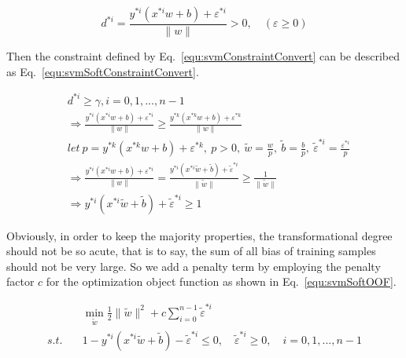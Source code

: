\documentclass[runningheads,openany]{xhlPaper}
\begin{document}
\begin{equation}
\label{equ:svmSoftDistance}
{d^{*i}} = \frac{{{y^{*i}}\left( {{x^{*i}}w + b} \right) + {\varepsilon ^{*i}}}}{{\parallel w\parallel }} > 0,\quad \left(\varepsilon \ge 0\right)
\end{equation}

Then the constraint defined by Eq.~\ref{equ:svmConstraintConvert} can be described as Eq.~\ref{equ:svmSoftConstraintConvert}.

\begin{equation}
\label{equ:svmSoftConstraintConvert}
\begin{aligned}
&{d^{*i}} \ge \gamma ,i = 0,1,...,n - 1\\
 &\Rightarrow \frac{{{y^{*i}}\left( {{x^{*i}}w + b} \right) + {\varepsilon ^{*i}}}}{{\parallel w\parallel }} \ge \frac{{{y^{*k}}\left( {{x^{*k}}w + b} \right) + {\varepsilon ^{*k}}}}{{\parallel w\parallel }}\\
&let\ p = {y^{*k}}\left( {{x^{*k}}w + b} \right) + {\varepsilon ^{*k}},\ p > 0,\ \tilde w = \frac{w}{p},\ \tilde b = \frac{b}{p},\ {{\tilde \varepsilon }^{*i}} = \frac{{{\varepsilon ^{*i}}}}{p}\\
 &\Rightarrow \frac{{{y^{*i}}\left( {{x^{*i}}w + b} \right) + {\varepsilon ^{*i}}}}{{\parallel w\parallel }} = \frac{{{y^{*i}}\left( {{x^{*i}}\tilde w + \tilde b} \right) + {{\tilde \varepsilon }^{*i}}}}{{\parallel \tilde w\parallel }} \ge \frac{1}{{\parallel \tilde w\parallel }}\\
 &\Rightarrow {y^{*i}}\left( {{x^{*i}}\tilde w + \tilde b} \right) + {{\tilde \varepsilon }^{*i}} \ge 1
\end{aligned}
\end{equation}

Obviously, in order to keep the majority properties, the transformational degree should not be so acute, that is to say, the sum of all bias of training samples should not be very large. So we add a penalty term by employing the penalty factor $c$ for the optimization object function as shown in Eq.~\ref{equ:svmSoftOOF}.

\begin{equation}
\label{equ:svmSoftOOF}
\begin{aligned}
&\mathop {\min }\limits_{\tilde w} \frac{1}{2}\parallel \tilde w{\parallel ^2} + c \sum\limits_{i = 0}^{n - 1} {{{\tilde \varepsilon }^{*i}}} \\
s.t.\quad &1 - {y^{*i}}\left( {{x^{*i}}\tilde w + \tilde b} \right) - {{\tilde \varepsilon }^{*i}} \le 0,\quad {{\tilde \varepsilon }^{*i}} \ge 0,\quad i = 0,1,...,n - 1
\end{aligned}
\end{equation}
\end{document}
